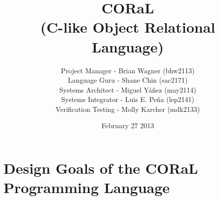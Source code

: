 \documentclass[11pt]{report}
\begin{document}
\title{CORaL\\
(C-like Object Relational Language)}
\author{Project Manager - Brian Wagner (bhw2113)\\
Language Guru - Shane Chin (sac2171)\\
Systems Architect - Miguel Y\'a\~nez (may2114)\\
Systems Integrator - Luis E. Pe\~na (lep2141)\\
Verification Testing - Molly Karcher (mdk2133)}
\date{February 27 2013}
\maketitle

\section*{Design Goals of the CORaL Programming Language}
\end{document}
